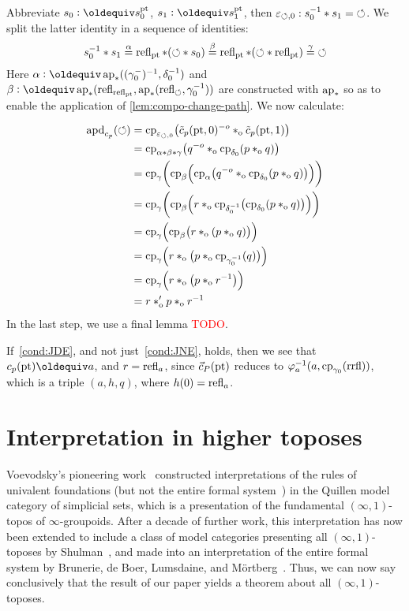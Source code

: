 \documentclass[a4paper,12pt]{amsart}
\begin{document}
Abbreviate $s_0 \defeq s^\pt_0$, $s_1 \defeq s^\pt_1$,
then $\varepsilon_{{\circlearrowleft},0} : s_0^{-1} * s_1 = {{\circlearrowleft}}$.
We split the latter identity in a sequence of identities:
\[
s_0^{-1} * s_1 \stackrel{\alpha}{=}
\mathop{{\mathrm{refl}}_{{\mathord{\mathrm{pt}}}}}*({\circlearrowleft}* s_0) \stackrel{\beta}{=}
\mathop{{\mathrm{refl}}_{{\mathord{\mathrm{pt}}}}}*({\circlearrowleft}*\mathop{{\mathrm{refl}}_{{\mathord{\mathrm{pt}}}}})\stackrel{\gamma}{=} {{\circlearrowleft}}
\]
Here $\alpha\defeq\apc((\gamma_0^-)^{-1},\delta_0^{-1})$ and
$\beta\defeq\apc(\refl{\refl{\pt}},\apc(\refl{\Zloop},\gamma_0^{-1}))$ are constructed with $\mathop{\mathrm{ap}_{*}}$ so as to
enable the application of \cref{lem:compo-change-path}.
We now calculate:

\begin{align*}
  \mathop{{\mathrm{apd}}_{c_p}}({\circlearrowleft})
  &= \mathrm{cp}_{\varepsilon_{{\circlearrowleft},0}}
    \bigl(\tilde c_p({\mathord{\mathrm{pt}}},0)^{-o} *_{\mathrm{o}} \tilde c_p({\mathord{\mathrm{pt}}},1)\bigr) \\
  &= \mathrm{cp}_{\alpha*\beta*\gamma}
    \bigl(q^{-o} *_{\mathrm{o}} \mathrm{cp}_{\delta_0}(p *_{\mathrm{o}} q)\bigr) \\
  &= \mathrm{cp}_{\gamma}\biggl(\mathrm{cp}_{\beta}\Bigl(\mathrm{cp}_{\alpha}
    \bigl(q^{-o} *_{\mathrm{o}} \mathrm{cp}_{\delta_0}(p *_{\mathrm{o}} q)\bigr)\Bigr)\biggr) \\
  &= \mathrm{cp}_{\gamma}\biggl(\mathrm{cp}_{\beta}\Bigl(
    r *_{\mathrm{o}} \mathrm{cp}_{\delta_0^{-1}}\bigl(\mathrm{cp}_{\delta_0}(p *_{\mathrm{o}} q)\bigr)
    \Bigr)\biggr) \\
  &= \mathrm{cp}_{\gamma}\Bigl(\mathrm{cp}_{\beta}\bigl(
    r *_{\mathrm{o}} (p *_{\mathrm{o}} q)\bigr)\Bigr) \\
  &= \mathrm{cp}_{\gamma}\Bigl(r *_{\mathrm{o}} \bigl(p *_{\mathrm{o}} \mathrm{cp}_{\gamma_0^{-1}}(q)\bigl)\Bigr) \\
  &= \mathrm{cp}_{\gamma}\Bigl(r *_{\mathrm{o}} \bigl(p *_{\mathrm{o}} r^{-1}\bigl)\Bigr) \\
  &= r *_{\mathrm{o}}' p *_{\mathrm{o}} r^{-1}
\end{align*}
In the last step, we use a final lemma \textcolor{red}{TODO}.

If~\cref{cond:JDE}, and not just~\cref{cond:JNE}, holds,
then we see that $c_p(\pt)\jdeq a$, and $r=\mathop{{\mathrm{refl}}_{a}}$,
since $\vec c_P({\mathord{\mathrm{pt}}})$ reduces to
$\varphi_{a}^{-1}(a,\mathrm{cp}_{\gamma_0}(\mathrm{rrfl}))$,
which is a triple $(a,h,q)$, where $h(0)=\mathop{{\mathrm{refl}}_{a}}$.

\section{Interpretation in higher toposes}
\label{sec:topos}

Voevodsky's pioneering work~\cite{1211.2851} constructed interpretations of the rules of univalent foundations (but not the entire formal system~\cite{voevodsky:not-interp}) in the Quillen model category of simplicial sets, which is a presentation of the fundamental $(\infty,1)$-topos of $\infty$-groupoids.
After a decade of further work, this interpretation has now been extended to include a class of model categories presenting all $(\infty,1)$-toposes by Shulman~\cite{shulman:univinj}, and made into an interpretation of the entire formal system by Brunerie, de Boer, Lumsdaine, and M\"{o}rtberg~\cite{initiality}.
Thus, we can now say conclusively that the result of our paper yields a theorem about all $(\infty,1)$-toposes.
\end{document}
